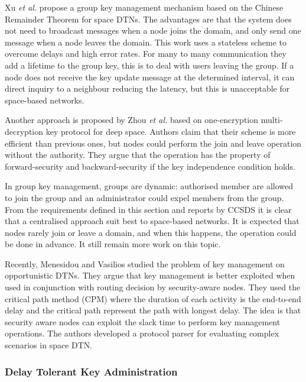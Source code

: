 Xu \textit{et al.} \cite{xu2012chinese} propose a group key management mechanism based on the Chinese Remainder Theorem for space DTNs. The advantages are that the system does not need to broadcast messages when a node joins the domain, and only send one message when a node leaves the domain. This work uses a stateless scheme to overcome delays and high error rates. For many to many communication they add a lifetime to the group key, this is to deal with users leaving the group.  If a node does not receive the key update message at the determined interval, it can direct inquiry to a neighbour reducing the latency, but this is unacceptable for space-based networks.

Another approach is proposed by Zhou \textit{et al.} \cite{zhou2014autonomic} based on one-encryption multi-decryption key protocol for deep space. Authors claim that their scheme is more efficient than previous ones, but nodes could perform the join and leave operation without the authority. They argue that the operation has the property of forward-security and backward-security if the key independence condition holds.

In group key management, groups are dynamic: authorised member are allowed to join the group and an administrator could expel members from the group. From the requirements defined in this section and reports by CCSDS \cite{standard2010ccsds,book2012architecture,book2006security} it is clear that a centralised approach suit best to space-based networks. It is expected that nodes rarely join or leave a domain, and when this happens, the operation could be done in advance. It still remain more work on this topic. 

Recently, Menesidou and Vasilios \cite{menesidou2016automated} studied the problem of key management on opportunistic DTNs. They argue that key management is better exploited when used in conjunction with routing decision by security-aware nodes. They used the critical path method (CPM) where the duration of each activity is the end-to-end delay and the critical path represent the path with longest delay. The idea is that security aware nodes can exploit the slack time to perform key management operations. The authors developed a protocol parser for evaluating complex scenarios in space DTN.




\subsubsection{Delay Tolerant Key Administration}

